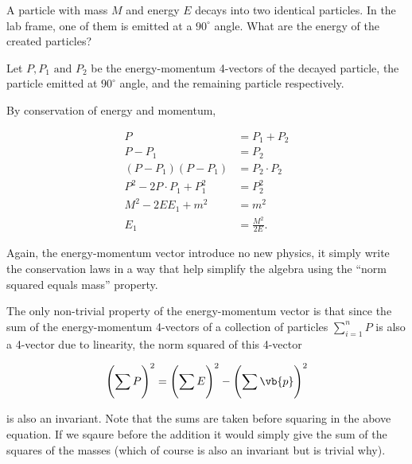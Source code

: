 \documentclass[english,a4paper,12pt]{report}
\begin{document}
{A particle with mass \(M\) and energy \(E\) decays into two identical particles. In the lab frame, one of them is emitted at a \(90 ^\circ \) angle. What are the energy of the created particles? }
{Let \(P, P_1 \text { and } P_2 \) be the energy-momentum 4-vectors of the decayed particle, the particle emitted at \(90 ^\circ \) angle, and the remaining particle respectively. 

By conservation of energy and momentum,

\begin{equation}
    \begin{aligned}
        P &= P_1 + P_2 \\
        P-P_1  &= P_2 \\
        (P - P_1 )(P - P_1 ) &= P_2 \cdot P_2 \\
        P^2 - 2 P \cdot  P_1  + P_1 ^2 &= P_2 ^2 \\
        M^2 - 2E E_1  + m^2 &= m^2 \\
        E_1  & = \frac{M^2}{2E}. 
    \end{aligned}
\end{equation}

Again, the energy-momentum vector introduce no new physics, it simply write the conservation laws in a way that help simplify the algebra using the ``norm squared equals mass'' property.
} 

The only non-trivial property of the energy-momentum vector is that since the sum of the energy-momentum 4-vectors of a collection of particles \(\sum_{i=1}^{n} P\)  is also a 4-vector due to linearity, the norm squared of this 4-vector

\begin{equation}
    \left( \sum_{}^{} P \right)^2 = \left( \sum_{}^{} E \right) ^2 - \left( \sum_{}^{} \vb{p}   \right) ^2 
\end{equation}

is also an invariant. Note that the sums are taken before squaring in the above equation. If we sqaure before the addition it would simply give the sum of the squares of the masses (which of course is also an invariant but is trivial why).
\end{document}
